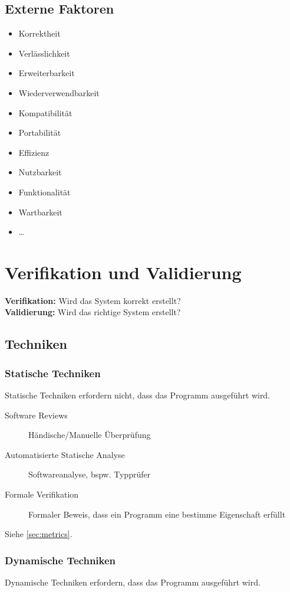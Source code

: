 		\subsection{Externe Faktoren}
			\begin{itemize}
				\item Korrektheit
				\item Verlässlichkeit
				\item Erweiterbarkeit
				\item Wiederverwendbarkeit
				\item Kompatibilität
				\item Portabilität
				\item Effizienz
				\item Nutzbarkeit
				\item Funktionalität
				\item Wartbarkeit
				\item \dots
			\end{itemize}

	\section{Verifikation und Validierung}
		\textbf{Verifikation:} Wird das System korrekt erstellt? \\
		\textbf{Validierung:} Wird das richtige System erstellt?

		\subsection{Techniken}
			\subsubsection{Statische Techniken}
				Statische Techniken erfordern nicht, dass das Programm ausgeführt wird.

				\begin{description}
					\item[Software Reviews] Händische/Manuelle Überprüfung
					\item[Automatisierte Statische Analyse] Softwareanalyse, bspw. Typprüfer
					\item[Formale Verifikation] Formaler Beweis, dass ein Programm eine bestimme Eigenschaft erfüllt
				\end{description}

				Siehe \ref{sec:metrics}.

			\subsubsection{Dynamische Techniken}
				Dynamische Techniken erfordern, dass das Programm ausgeführt wird.


